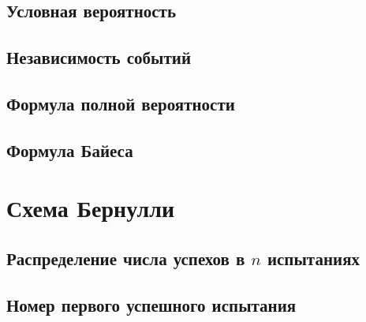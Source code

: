 \subsection{Условная вероятность}


\subsection{Независимость событий}


\subsection{Формула полной вероятности}


\subsection{Формула Байеса}





\section{Схема Бернулли}

\subsection{Распределение числа успехов в \texorpdfstring{$n$}{n} испытаниях}


\subsection{Номер первого успешного испытания}
% 

% 

% 